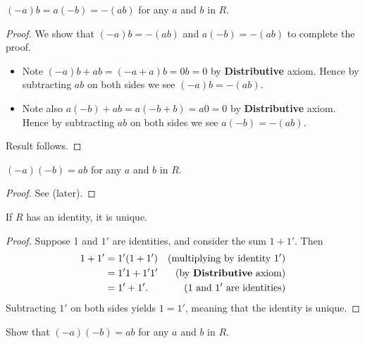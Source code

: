\begin{proposition}\label{prop-product-of-element-and-additive-inverse-is-additive-inverse-of-product}
    $(-a)b = a(-b) = -(ab)$ for any $a$ and $b$ in $R$.
\end{proposition}
\begin{proof}
    We show that $(-a)b = -(ab)$ and $a(-b) = -(ab)$ to complete the proof.
    \begin{itemize}
        \item Note $(-a)b + ab = (-a + a)b = 0b = 0$ by \textbf{Distributive} axiom. Hence by subtracting $ab$ on both sides we see $(-a)b = -(ab)$.
        \item Note also $a(-b) + ab = a(-b + b) = a0 = 0$ by \textbf{Distributive} axiom. Hence by subtracting $ab$ on both sides we see $a(-b) = -(ab)$.
    \end{itemize}
    Result follows.
\end{proof}

\begin{proposition}
    $(-a)(-b) = ab$ for any $a$ and $b$ in $R$.
\end{proposition}
\begin{proof}
    See  (later).
\end{proof}

\begin{proposition}
    If $R$ has an identity, it is unique.
\end{proposition}
\begin{proof}
    Suppose 1 and $1'$ are identities, and consider the sum $1 + 1'$. Then
    \begin{align*}
        1 + 1' &= 1'(1+1') & (\text{multiplying by identity }1')\\
        &= 1'1 + 1'1' & (\text{by \textbf{Distributive} axiom})\\
        &= 1' + 1'. & (1 \text{ and } 1' \text{ are identities})
    \end{align*}
    Subtracting $1'$ on both sides yields $1 = 1'$, meaning that the identity is unique.
\end{proof}

\begin{exercise}\label{exercise-product-of-additive-inverses}
    Show that $(-a)(-b) = ab$ for any $a$ and $b$ in $R$.
\end{exercise}

\newpage

